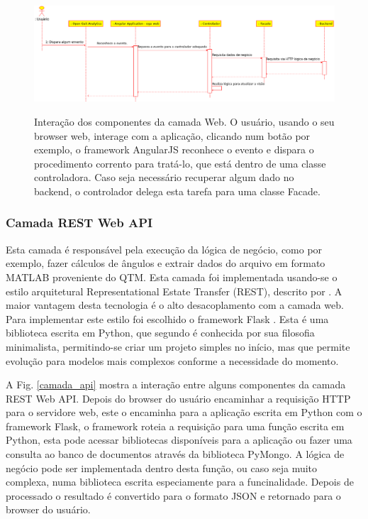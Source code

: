 \documentclass[journal]{IEEEtran}
\begin{document}
\begin{figure}[tb]
	\centering
	{\includegraphics[width=\textwidth]{camada_web}}
	\caption{Interação dos componentes da camada Web.  O usuário, usando o seu browser web, interage com a aplicação, clicando num botão por exemplo, o framework AngularJS reconhece o evento e dispara o procedimento corrento para tratá-lo, que está dentro de uma classe controladora. Caso seja necessário recuperar algum dado no backend, o controlador delega esta tarefa para uma classe Facade.}
	\label{camada_web}
\end{figure}

\subsubsection{Camada REST Web API}

Esta camada é responsável pela execução da lógica de negócio, como por exemplo,
fazer cálculos de ângulos e extrair dados do arquivo em formato MATLAB proveniente do QTM.
Esta camada foi implementada usando-se o estilo arquitetural Representational Estate Transfer (REST),
descrito por \cite{Grinberg2014}. A maior vantagem desta tecnologia é o alto desacoplamento com a
camada web. Para implementar este estilo foi escolhido o framework Flask \cite{Maia2015}. Esta é 
uma biblioteca escrita em Python,  que segundo \cite{Maia2015} é conhecida por sua filosofia minimalista,
permitindo-se criar um projeto simples no início, mas que permite evolução para modelos
mais complexos conforme a necessidade do momento.

A Fig. \ref{camada_api} mostra a interação entre alguns componentes da camada REST Web API.
Depois do browser do usuário encaminhar a requisição HTTP para o servidore web, este o 
encaminha para a aplicação escrita em Python com o framework Flask, o framework roteia
a requisição para uma função escrita em Python, esta pode acessar bibliotecas disponíveis
para a aplicação ou fazer uma consulta ao banco de documentos através da biblioteca PyMongo.
A lógica de negócio pode ser implementada dentro desta função, ou caso seja muito complexa,
numa biblioteca escrita especiamente para a funcinalidade.
Depois de processado o resultado é convertido para o formato JSON e retornado para o browser
do usuário.
\end{document}
